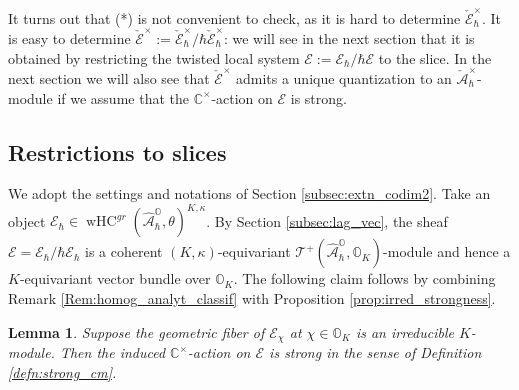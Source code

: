 \documentclass[12pt]{amsart}
\newcommand{\C}{\mathbb{C}}
\newcommand{\A}{\mathcal{A}}
\newcommand{\Orb}{\mathbb{O}}
\newcommand{\TT}{\mathscr{T}}
\newcommand{\cm}{\C^\times}
\newcommand{\EE}{\mathcal{E}}
\newcommand{\wHC}{\operatorname{wHC}}
\newtheorem{Lem}[Thm]{Lemma}
\theoremstyle{definition}
\newtheorem{Rem}[Thm]{Remark}
\numberwithin{equation}{section}
\begin{document}

It turns out that (*) is not convenient to check, as it is hard to determine $\check{\mathcal{E}}^\times_\hbar$.
It is easy to determine $\check{\mathcal{E}}^\times:=\check{\mathcal{E}}^\times_\hbar/\hbar \check{\mathcal{E}}^\times_\hbar$: we will see in the next section that it is obtained by restricting the twisted local system $\mathcal{E}:=\mathcal{E}_\hbar/\hbar \mathcal{E}$ to the slice.
In the next section we will also see that $\check{\mathcal{E}}^\times$ admits a unique quantization to
an $\check{\A}_\hbar^\times$-module if we assume that the $\C^\times$-action on $\mathcal{E}$ is strong.


\subsection{Restrictions to slices}
We adopt the settings and notations of Section \ref{subsec:extn_codim2}.
Take an object $\mathcal{E}_\hbar \in \wHC^{gr}(\hat{\A}_\hbar^{\Orb},\theta)^{K,\kappa}$.  By Section \ref{subsec:lag_vec}, the sheaf $\EE = \EE_\hbar / \hbar \EE_\hbar$ is a coherent $(K,\kappa)$-equivariant $\TT^+(\hat{\A}_\hbar^\Orb, \Orb_K)$-module and hence a $K$-equivariant vector bundle over $\Orb_K$.
The following claim follows by combining Remark \ref{Rem:homog_analyt_classif} with Proposition \ref{prop:irred_strongness}. 

\begin{Lem}\label{Lem:irred_strongness_HC} 
	Suppose the geometric fiber of $\mathcal{E}_\chi$ at $\chi \in \Orb_K$ is an irreducible $K$-module.
	Then the induced $\cm$-action on $\EE$ is strong in the sense of Definition \ref{defn:strong_cm}.
\end{Lem}
\end{document}
